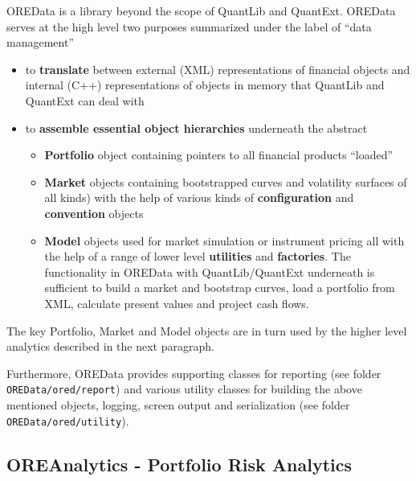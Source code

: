 \documentclass[12pt, a4paper]{report}
\begin{document}
OREData is a library beyond the scope of QuantLib and QuantExt. OREData serves at the high level two purposes summarized under the label of ``data management''
\begin{itemize}
\item to {\bf translate} between external (XML) representations of financial objects and internal (C++) representations of objects in memory that QuantLib and QuantExt can deal with
\item to {\bf assemble essential object hierarchies} underneath the abstract
\begin{itemize}
\item {\bf Portfolio} object containing pointers to all financial products ``loaded''
\item {\bf Market} objects containing bootstrapped curves and volatility surfaces of all kinds) with the help of various kinds of {\bf configuration} and {\bf convention} objects
\item {\bf Model} objects used for market simulation or instrument pricing all with the help of a range of lower level {\bf utilities} and {\bf factories}. 
The functionality in OREData with QuantLib/QuantExt underneath is sufficient to build a market and bootstrap curves, load a portfolio from XML, calculate present values and project cash flows.
\end{itemize}
\end{itemize}

The key Portfolio, Market and Model objects are in turn used by the higher level analytics described in the next paragraph.

Furthermore, OREData provides supporting classes for reporting (see folder {\tt OREData/ored/report}) and various utility classes for building the above mentioned objects, logging, screen output and serialization (see folder {\tt OREData/ored/utility}).

\subsection*{OREAnalytics - Portfolio Risk Analytics}
\end{document}
